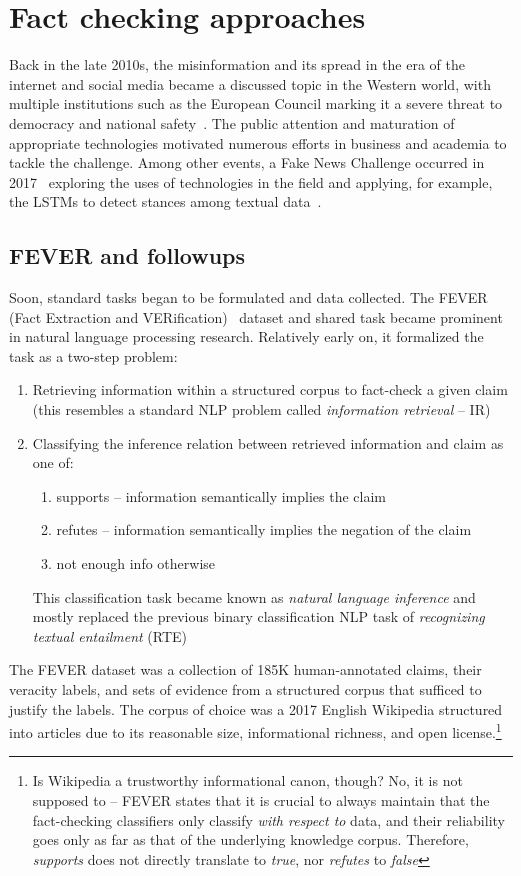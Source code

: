 \section{Fact checking approaches}
Back in the late 2010s, the misinformation and its spread in the era of the internet and social media became a discussed topic in the Western world, with multiple institutions such as the European Council marking it a severe threat to democracy and national safety~\cite{disorder}.
The public attention and maturation of appropriate technologies motivated numerous efforts in business and academia to tackle the challenge.
Among other events, a Fake News Challenge occurred in 2017~\cite{fncweb} exploring the uses of technologies in the field and applying, for example, the LSTMs to detect stances among textual data~\cite{fnc}.

\subsection{FEVER and followups}
Soon, standard tasks began to be formulated and data collected. 
The FEVER (Fact Extraction and VERification)~\cite{fever} dataset and shared task became prominent in natural language processing research.
Relatively early on, it formalized the task as a two-step problem:
\begin{enumerate}
    \item Retrieving information within a structured corpus to fact-check a given claim (this resembles a standard NLP problem called \textit{information retrieval} -- IR)
    \item Classifying the inference relation between retrieved information and claim as one of:
    \begin{enumerate}
        \item {\techbf supports} -- information semantically implies the claim 
        \item {\techbf refutes} -- information semantically implies the negation of the claim 
        \item {\techbf not enough info} otherwise 
    \end{enumerate}
    This classification task became known as \textit{natural language inference} and mostly replaced the previous binary classification NLP task of \textit{recognizing textual entailment} (RTE)
\end{enumerate}

The FEVER dataset was a collection of 185K human-annotated claims, their veracity labels, and sets of evidence from a structured corpus that sufficed to justify the labels.
The corpus of choice was a 2017 English Wikipedia structured into articles due to its reasonable size, informational richness, and open license.\footnote{Is Wikipedia a trustworthy informational canon, though? 
No, it is not supposed to -- FEVER states that it is crucial to always maintain that the fact-checking classifiers only classify \textit{with respect to} data, and their reliability goes only as far as that of the underlying knowledge corpus. Therefore, \textit{supports} does not directly translate to \textit{true}, nor \textit{refutes} to \textit{false}}

